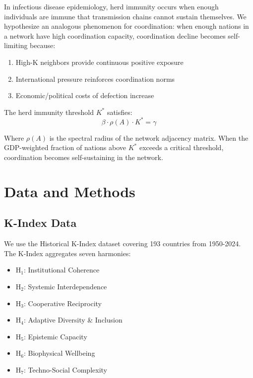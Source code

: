 \documentclass[12pt,a4paper]{article}
\begin{document}
In infectious disease epidemiology, herd immunity occurs when enough individuals are immune that transmission chains cannot sustain themselves. We hypothesize an analogous phenomenon for coordination: when enough nations in a network have high coordination capacity, coordination decline becomes self-limiting because:
\begin{enumerate}
    \item High-K neighbors provide continuous positive exposure
    \item International pressure reinforces coordination norms
    \item Economic/political costs of defection increase
\end{enumerate}

The herd immunity threshold $K^*$ satisfies:
\begin{equation}
\beta \cdot \rho(A) \cdot K^* = \gamma
\end{equation}

Where $\rho(A)$ is the spectral radius of the network adjacency matrix. When the GDP-weighted fraction of nations above $K^*$ exceeds a critical threshold, coordination becomes self-sustaining in the network.

\section{Data and Methods}
\label{sec:methods}

\subsection{K-Index Data}

We use the Historical K-Index dataset \citep{Paper1} covering 193 countries from 1950-2024. The K-Index aggregates seven harmonies:
\begin{itemize}
    \item H$_1$: Institutional Coherence
    \item H$_2$: Systemic Interdependence
    \item H$_3$: Cooperative Reciprocity
    \item H$_4$: Adaptive Diversity \& Inclusion
    \item H$_5$: Epistemic Capacity
    \item H$_6$: Biophysical Wellbeing
    \item H$_7$: Techno-Social Complexity
\end{itemize}
\end{document}
